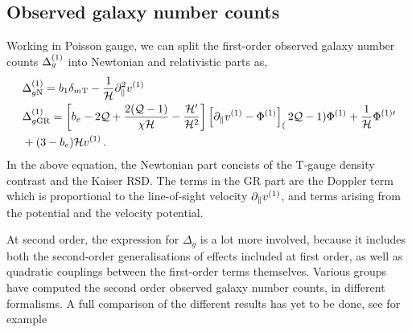 \subsection{Observed galaxy number counts}
Working in Poisson gauge, we can split the first-order observed galaxy number counts $\Delta_g^{(1)}$ into Newtonian and relativistic parts as, 
\begin{align}
	&\Delta_{g\mathrm{N}}^{(1)} = b_1 \delta_{m\mathrm{T}} - \frac{1}{\mathcal{H}} \partial_\parallel^2 v^{(1)}\,\label{eq:DeltagNFO}\\
	&\Delta_{g\mathrm{GR}}^{(1)} = \left[ b_e - 2 \mathcal{Q} + \frac{2 (\mathcal{Q} - 1)}{\chi \mathcal{H}} - \frac{\mathcal{H}'}{\mathcal{H}^2} \right] \left[ \partial_\parallel v^{(1)} - \Phi^{(1)} \right] _ (2 \mathcal{Q} - 1) \Phi^{(1)} + \frac{1}{\mathcal{H}} \Phi^{{(1)} \prime} \nonumber \\
	& + (3 - b_e) \mathcal{H} v^{(1)}\,\label{eq:DeltagGRFO}.
\end{align}
In the above equation, the Newtonian part concists of the T-gauge density contrast and the Kaiser RSD. The terms in the GR part are the Doppler term which is proportional to the line-of-sight velocity $\partial_\parallel v^{(1)}$, and terms arising from the potential and the velocity potential. 

At second order, the expression for $\Delta_g$ is a lot more involved, because it includes both the second-order generalisations of effects included at first order, as well as quadratic couplings between the first-order terms themselves. Various groups have computed the second order observed galaxy number counts, in different formalisms. A full comparison of the different results has yet to be done, see for example

